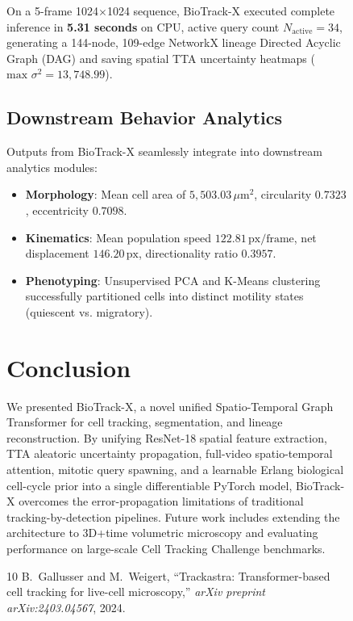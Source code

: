 \documentclass[10pt,journal,compsoc]{IEEEtran}
\begin{document}
\begin{figure}[t]
On a 5-frame 1024$\times$1024 sequence, BioTrack-X executed complete inference in \textbf{5.31 seconds} on CPU, active query count $N_{\text{active}} = 34$, generating a 144-node, 109-edge NetworkX lineage Directed Acyclic Graph (DAG) and saving spatial TTA uncertainty heatmaps ($\text{max } \sigma^2 = 13,748.99$).

\subsection{Downstream Behavior Analytics}
Outputs from BioTrack-X seamlessly integrate into downstream analytics modules:
\begin{itemize}
    \item \textbf{Morphology}: Mean cell area of $5,503.03\,\mu\text{m}^2$, circularity $0.7323$, eccentricity $0.7098$.
    \item \textbf{Kinematics}: Mean population speed $122.81\,\text{px/frame}$, net displacement $146.20\,\text{px}$, directionality ratio $0.3957$.
    \item \textbf{Phenotyping}: Unsupervised PCA and K-Means clustering successfully partitioned cells into distinct motility states (quiescent vs. migratory).
\end{itemize}

\section{Conclusion}
\label{sec:conclusion}
We presented BioTrack-X, a novel unified Spatio-Temporal Graph Transformer for cell tracking, segmentation, and lineage reconstruction. By unifying ResNet-18 spatial feature extraction, TTA aleatoric uncertainty propagation, full-video spatio-temporal attention, mitotic query spawning, and a learnable Erlang biological cell-cycle prior into a single differentiable PyTorch model, BioTrack-X overcomes the error-propagation limitations of traditional tracking-by-detection pipelines. Future work includes extending the architecture to 3D+time volumetric microscopy and evaluating performance on large-scale Cell Tracking Challenge benchmarks.

\begin{thebibliography}{10}
B.~Gallusser and M.~Weigert, ``Trackastra: Transformer-based cell tracking for live-cell microscopy,'' \emph{arXiv preprint arXiv:2403.04567}, 2024.


\end{thebibliography}
\end{figure}
\end{document}
